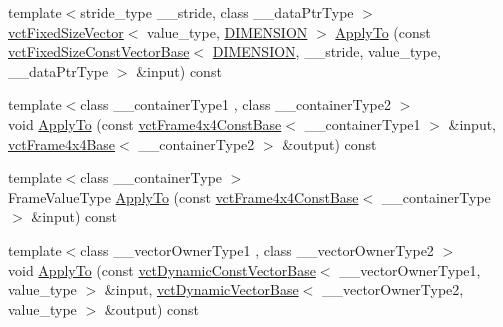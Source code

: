 \begin{DoxyCompactItemize}
\item 
{\footnotesize template$<$stride\+\_\+type \+\_\+\+\_\+stride, class \+\_\+\+\_\+data\+Ptr\+Type $>$ }\\\hyperlink{classvct_fixed_size_vector}{vct\+Fixed\+Size\+Vector}$<$ value\+\_\+type, \hyperlink{classvct_frame4x4_const_base_aa9000d4539e9ab27b091692d4bd0d986a97d7212e6c46dc9acbbd11bbc573d9a0}{D\+I\+M\+E\+N\+S\+I\+O\+N} $>$ \hyperlink{classvct_frame4x4_const_base_a8767522d9f97256a849b53bdd083ce18}{Apply\+To} (const \hyperlink{classvct_fixed_size_const_vector_base}{vct\+Fixed\+Size\+Const\+Vector\+Base}$<$ \hyperlink{classvct_frame4x4_const_base_aa9000d4539e9ab27b091692d4bd0d986a97d7212e6c46dc9acbbd11bbc573d9a0}{D\+I\+M\+E\+N\+S\+I\+O\+N}, \+\_\+\+\_\+stride, value\+\_\+type, \+\_\+\+\_\+data\+Ptr\+Type $>$ \&input) const 
\item 
{\footnotesize template$<$class \+\_\+\+\_\+container\+Type1 , class \+\_\+\+\_\+container\+Type2 $>$ }\\void \hyperlink{classvct_frame4x4_const_base_a986730ca3c96736d8e6ce42067836fbf}{Apply\+To} (const \hyperlink{classvct_frame4x4_const_base}{vct\+Frame4x4\+Const\+Base}$<$ \+\_\+\+\_\+container\+Type1 $>$ \&input, \hyperlink{classvct_frame4x4_base}{vct\+Frame4x4\+Base}$<$ \+\_\+\+\_\+container\+Type2 $>$ \&output) const 
\item 
{\footnotesize template$<$class \+\_\+\+\_\+container\+Type $>$ }\\Frame\+Value\+Type \hyperlink{classvct_frame4x4_const_base_a962239489fa268ef59bc03becc68ca33}{Apply\+To} (const \hyperlink{classvct_frame4x4_const_base}{vct\+Frame4x4\+Const\+Base}$<$ \+\_\+\+\_\+container\+Type $>$ \&input) const 
\item 
{\footnotesize template$<$class \+\_\+\+\_\+vector\+Owner\+Type1 , class \+\_\+\+\_\+vector\+Owner\+Type2 $>$ }\\void \hyperlink{classvct_frame4x4_const_base_a57baebdab20bbaa46bc29aaad1cecff1}{Apply\+To} (const \hyperlink{classvct_dynamic_const_vector_base}{vct\+Dynamic\+Const\+Vector\+Base}$<$ \+\_\+\+\_\+vector\+Owner\+Type1, value\+\_\+type $>$ \&input, \hyperlink{classvct_dynamic_vector_base}{vct\+Dynamic\+Vector\+Base}$<$ \+\_\+\+\_\+vector\+Owner\+Type2, value\+\_\+type $>$ \&output) const 
\item 

\end{DoxyCompactItemize}
